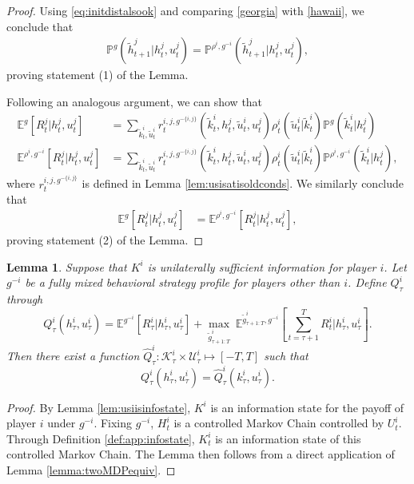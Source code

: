 \documentclass[pdflatex,sn-basic]{sn-jnl}
\newcommand{\E}{\mathbb{E}}
\renewcommand{\Pr}{\mathbb{P}}
\newcommand{\Qfunc}{Q}
\newcommand{\Comp}{K}
\newcommand{\comp}{k}
\newcommand{\Compset}{\mathcal{K}}
\theoremstyle{thmstyleone}%
\newtheorem{lemma}{Lemma}
\theoremstyle{thmstyletwo}%
\theoremstyle{thmstylethree}%
\begin{document}
\begin{appendices}
\begin{proof}
	{Using \eqref{eq:initdistalsook} and comparing \eqref{georgia} with \eqref{hawaii},} we conclude that
	\begin{align}
		\Pr^g(\tilde{h}_{t+1}^j|h_t^j, u_t^j) = \Pr^{\rho^i, g^{-i}}(\tilde{h}_{t+1}^j|h_t^j, u_t^j),
	\end{align}
    {proving statement (1) of the Lemma.}
	
	Following an analogous argument, we can show that
	\begin{align}
		\E^g[R_{t}^j|h_t^j, u_t^j] &=\sum_{\tilde{\comp}_t^i, \tilde{u}_t^i} r_t^{i, j, g^{-\{i, j\}}} (\tilde{\comp}_t^i, h_t^j, 	\tilde{u}_t^i, u_t^j) \rho_t^i(\tilde{u}_t^i|\tilde{\comp}_t^i) \Pr^g(\tilde{\comp}_t^i|h_t^j)\\
		\E^{\rho^i, g^{-i}}[R_{t}^j|h_t^j, u_t^j] &=\sum_{\tilde{\comp}_t^i, \tilde{u}_t^i} r_t^{i, j, g^{-\{i, j\}}} (\tilde{\comp}_t^i, h_t^j, 	\tilde{u}_t^i, u_t^j) \rho_t^i(\tilde{u}_t^i|\tilde{\comp}_t^i) \Pr^{\rho^i, g^{-i}}(\tilde{\comp}_t^i|h_t^j),
	\end{align}
	where $r_t^{i, j, g^{-\{i, j\}}}$ is defined in Lemma \ref{lem:usisatisoldconds}.
	{We similarly conclude that} 
	\begin{align}
		\E^g[R_{t}^j|h_t^j, u_t^j] &= \E^{\rho^i, g^{-i}}[R_{t}^j|h_t^j, u_t^j],
	\end{align}
	{proving statement (2) of the Lemma.}
\end{proof}

\begin{lemma}\label{lem:selfKfunc}
	{Suppose that $\Comp^i$ is unilaterally sufficient information for player $i$. Let $g^{-i}$ be a fully mixed behavioral strategy profile for players other than $i$.} Define $\Qfunc_\tau^i$ through
	\begin{equation}
		\Qfunc_\tau^i(h_\tau^i, u_\tau^i) = \E^{g^{-i}}[R_\tau^i|h_\tau^i, u_\tau^i] + \underset{\tilde{g}_{\tau+1:T}^i}{\max}~\E^{\tilde{g}_{\tau+1:T}^i, g^{-i}}\left[\sum_{t=\tau+1}^{T} R_t^i\Big|h_\tau^i, u_\tau^i\right].
	\end{equation}
	Then there exist a function $\hat{\Qfunc}_\tau^{i}: \Compset_\tau^i\times \mathcal{U}_\tau^i\mapsto [-T, T]$ such that
	\begin{equation}
		\Qfunc_\tau^i(h_\tau^i, u_\tau^i) = \hat{\Qfunc}_\tau^{i}(\comp_\tau^i, u_\tau^i).
	\end{equation}
\end{lemma}

\begin{proof}
	{By Lemma \ref{lem:usiisinfostate}, $\Comp^i$ is an information state for the payoff of player $i$ under $g^{-i}$. Fixing $g^{-i}$, $H_t^i$ is a controlled Markov Chain controlled by $U_t^i$. Through Definition \ref{def:app:infostate}, $\Comp_t^i$ is an information state of this controlled Markov Chain. The Lemma then follows from a direct application of Lemma \ref{lemma:twoMDPequiv}.} 
\end{proof}


\end{appendices}
\end{document}
